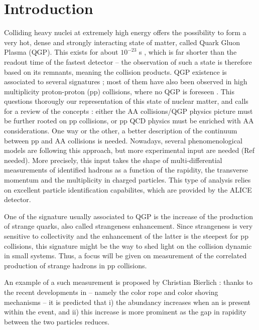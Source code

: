 \newpage


\section{Introduction}
\label{sec:Section01-Intro}

Colliding heavy nuclei at extremely high energy offers the possibility to form a very hot, dense and strongly interacting state of matter, called Quark Gluon Plasma (QGP). This exists for about $10^{-23}$ s \cite{bjorken_highly_1983}, which is far shorter than the readout time of the fastest detector -- the observation of such a state is therefore based on its remnants, meaning the collision products. QGP existence is associated to several signatures ; most of them have also been observed in high multiplicity proton-proton (pp) collisions, where no QGP is foreseen \cite{cms_collaboration_evidence_2015}\cite{alice_collaboration_enhanced_2017}\cite{alice_collaboration_multiplicity_2016}. This questions thorougly our representation of this state of nuclear matter, and calls for a review of the concepts : either the AA collisions/QGP physics picture must be further rooted on pp collisions, or pp QCD physics must be enriched with AA considerations. One way or the other, a better description of the continuum between pp and AA collisions is needed. Nowadays, several phenomenological models are following this approach, but more experimental input are needed (Ref needed). More precisely, this input takes the shape of multi-differential measurements of identified hadrons as a function of the rapidity, the transverse momentum and the multiplicity in charged particles. This type of analysis relies on excellent particle identification capabilites, which are provided by the ALICE detector.

One of the signature usually associated to QGP is the increase of the production of strange quarks, also called strangeness enhancement. Since strangeness is very sensitive to collectivity and the enhancement of the latter is the steepest for pp collisions, this signature might be the way to shed light on the collision dynamic in small systems. Thus, a focus will be given on measurement of the correlated production of strange hadrons in pp collisions. 

An example of a such measurement is proposed by Christian Bierlich : thanks to the recent developments in \Pythiaeight -- namely the color rope and color shoving mechanisms -- it is predicted that i) the \rmOmegaM [$sss$] abundancy increases when an \rmPhiMes [$s \bar{s}$] is present within the event, and ii) this increase is more prominent as the gap in rapidity between the two particles reduces. 

